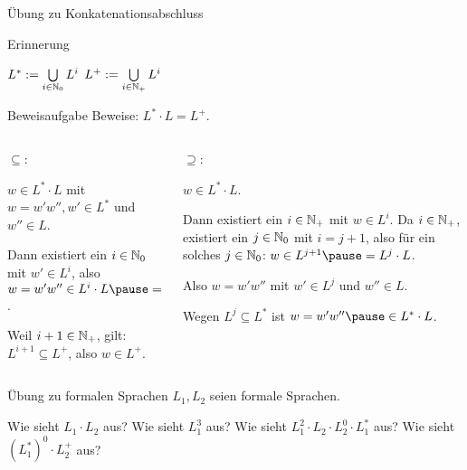 \documentclass{beamer}
\begin{document}
\begin{frame}{Übung zu Konkatenationsabschluss}
	\begin{exampleblock}{Erinnerung}
		\begin{center}
			$L^* := \bigcup\limits_{i \in \mathbb{N}_0} L^i$\qquad
			$L^+ := \bigcup\limits_{i \in \mathbb{N}_+} L^i$
		\end{center}
	\end{exampleblock}

	\begin{taskblock}{Beweisaufgabe}
		Beweise: $L^* \cdot L = L^+$.
	\end{taskblock}

	\pause
	\begin{columns}
		\begin{column}{0.4\textwidth}
			$\subseteq$:
			
			\p{} \p $w \in L^* \cdot L$ mit $w = w'w'', w' \in L^*$ und $w'' \in L$.
			
			\vspace{.3cm}
			
			\p Dann existiert ein $i \in \mathbb{N}_0$ mit $w' \in L^i$\p , also $w = w'w'' \in L^i \cdot L \p = L^{i+1}$.
			
			\vspace{.3cm}
			
			\p Weil $i+1\in \mathbb{N}_+$\p , gilt: $L^{i+1} \subseteq L^+$\p , also $w \in L^+$.
		\end{column}
		
		\begin{column}{0.6\textwidth}
			$\supseteq$:
			
			\p{} \p $w \in L^*\cdot L$.
			
			\vspace{.3cm}
			
			\p Dann existiert ein $i \in \mathbb{N}_+$ mit $w \in L^i$. \p Da $i \in \mathbb{N}_+$\p , existiert ein $j \in \mathbb{N}_0$ mit $i = j+1$\p , also für ein solches $j \in \mathbb{N}_0$\p : $w \in L^{j+1} \p = L^j \cdot L$.
			
			\vspace{.3cm}
			
			\p Also $w = w'w''$ mit $w' \in L^j$ und $w'' \in L$.
			
			\vspace{.3cm}
			
			\p Wegen $L^j \subseteq L^*$ \p ist $w = w'w'' \p \in L^* \cdot L$.
		\end{column}
	\end{columns}
\end{frame}

\begin{frame}{Übung zu formalen Sprachen}
	$L_1, L_2$ seien formale Sprachen.
	\begin{itemize}
		\pitem Wie sieht $L_1 \cdot L_2$ aus?
		\pitem Wie sieht $L_1^3$ aus?
		\pitem Wie sieht $L_1^2 \cdot L_2 \cdot L_2^0 \cdot L_1^*$ aus?
		\pitem Wie sieht $(L_1^*)^0 \cdot L_2^+$ aus?
	\end{itemize}	
\end{frame}



\end{document}
